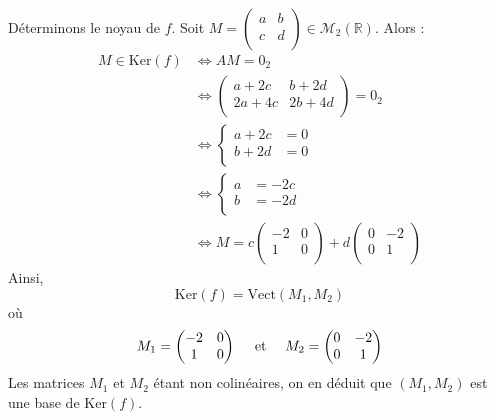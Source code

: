 \documentclass[a4paper,twoside,french,11pt]{VcCours}
\begin{document}
\begin{enumerate}
\noindent Déterminons le noyau de $f$. Soit $M = \begin{pmatrix}
a&b \\
c & d \\
\end{pmatrix} \in \mathcal{M}_2(\mathbb{R})$. Alors :
\begin{align*}
M \in \textrm{Ker}(f) & \Longleftrightarrow  AM = 0_2 \\
& \Longleftrightarrow \begin{pmatrix}
a+2c & b+2d \\
2a+4c & 2b+4d \\
\end{pmatrix} = 0_2 \\
& \Longleftrightarrow \left\lbrace \begin{array}{cl}
a+2c & = 0 \\
b+2d & = 0 \\
\end{array}\right. \\
& \Longleftrightarrow \left\lbrace \begin{array}{cl}
a& = -2c \\
b & = -2d \\
\end{array}\right. \\
& \Longleftrightarrow  M = c \begin{pmatrix}
-2 & 0 \\
1 & 0 \\
\end{pmatrix} + d \begin{pmatrix}
0 & -2 \\
0 & 1 \\
\end{pmatrix}
\end{align*}
Ainsi,
$$ \textrm{Ker}(f) = \textrm{Vect}(M_1,M_2)$$
où
$$ M_1 = \begin{pmatrix}
-2 & 0 \\
1 & 0 \\
\end{pmatrix} \quad \hbox{ et } \quad M_2 = \begin{pmatrix}
0 & -2 \\
0 & 1 \\
\end{pmatrix}$$
Les matrices $M_1$ et $M_2$ étant non colinéaires, on en déduit que $(M_1,M_2)$ est une base de $\textrm{Ker}(f)$.




\end{enumerate}
\end{document}
